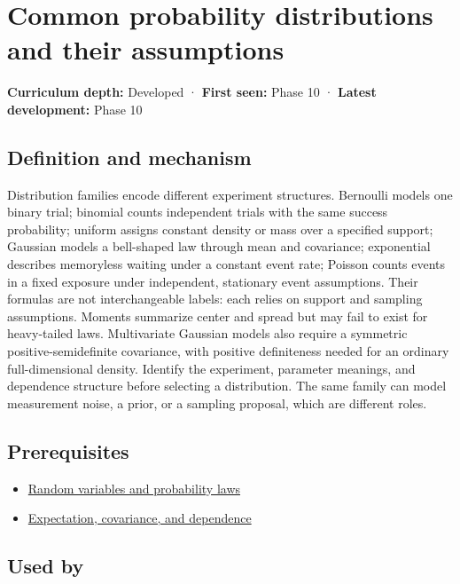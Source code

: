\hypertarget{appendix-a2360b435383}{}
\section{Common probability distributions and their assumptions}\label{appendix-a2360b435383-common-probability-distributions-and-their-assumptions}

\textbf{Curriculum depth:} Developed · \textbf{First seen:} Phase 10 · \textbf{Latest development:} Phase 10

\subsection{Definition and mechanism}\label{appendix-a2360b435383-definition-and-mechanism}

Distribution families encode different experiment structures. Bernoulli models one binary trial; binomial counts independent trials with the same success probability; uniform assigns constant density or mass over a specified support; Gaussian models a bell-shaped law through mean and covariance; exponential describes memoryless waiting under a constant event rate; Poisson counts events in a fixed exposure under independent, stationary event assumptions. Their formulas are not interchangeable labels: each relies on support and sampling assumptions. Moments summarize center and spread but may fail to exist for heavy-tailed laws. Multivariate Gaussian models also require a symmetric positive-semidefinite covariance, with positive definiteness needed for an ordinary full-dimensional density. Identify the experiment, parameter meanings, and dependence structure before selecting a distribution. The same family can model measurement noise, a prior, or a sampling proposal, which are different roles.

\subsection{Prerequisites}\label{appendix-a2360b435383-prerequisites}

\begin{itemize}
\tightlist
\item
  \hyperref[appendix-4d0203f7944f]{Random variables and probability laws}
\item
  \hyperref[appendix-54c383df9992]{Expectation, covariance, and dependence}
\end{itemize}

\subsection{Used by}\label{appendix-a2360b435383-used-by}

